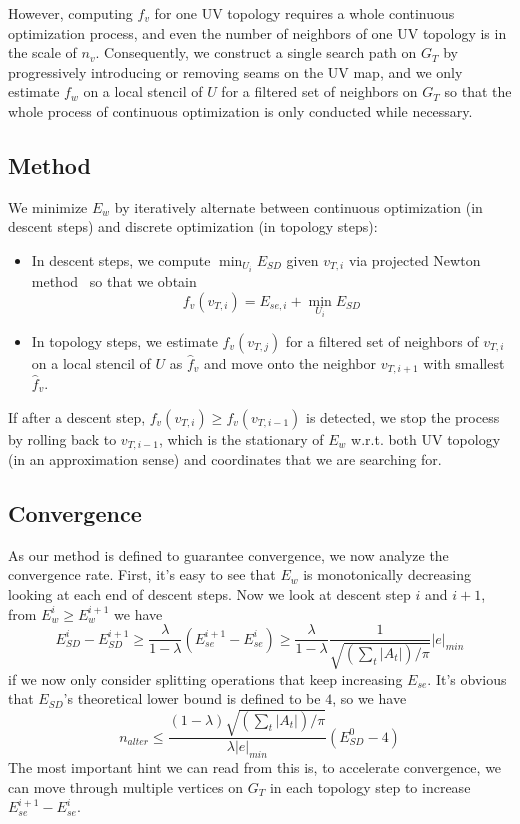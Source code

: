 However, computing $f_v$ for one UV topology requires a whole continuous optimization process, and even the number of neighbors of one UV topology is in the scale of $n_v$. Consequently, we construct a single search path on $G_T$ by progressively introducing or removing seams on the UV map, and we only estimate $f_w$ on a local stencil of $U$ for a filtered set of neighbors on $G_T$ so that the whole process of continuous optimization is only conducted while necessary.

\subsection{Method}

We minimize $E_w$ by iteratively alternate between continuous optimization (in descent steps) and discrete optimization (in topology steps):
\begin{itemize}
\item In descent steps, we compute $\min_{U_i} E_{SD}$ given $v_{T,i}$ via projected Newton method~\cite{Teran2005Robust} so that we obtain
\[ f_v(v_{T,i}) = E_{se,i} + \min_{U_i} E_{SD} \]
\item In topology steps, we estimate $f_v(v_{T,j})$ for a filtered set of neighbors of $v_{T,i}$ on a local stencil of $U$ as $\hat{f}_v$ and move onto the neighbor $v_{T,i+1}$ with smallest $\hat{f}_v$.
\end{itemize}
If after a descent step, $f_v(v_{T,i}) \geq f_v(v_{T,i-1})$ is detected, we stop the process by rolling back to $v_{T,i-1}$, which is the stationary of $E_w$ w.r.t. both UV topology (in an approximation sense) and coordinates that we are searching for.

\subsection{Convergence}

As our method is defined to guarantee convergence, we now analyze the convergence rate. First, it's easy to see that $E_w$ is monotonically decreasing looking at each end of descent steps. Now we look at descent step $i$ and $i+1$, from $E^i_w \geq E^{i+1}_w$ we have
\[ E^i_{SD} - E^{i+1}_{SD} \geq \frac{\lambda}{1-\lambda} (E^{i+1}_{se} - E^i_{se}) \geq \frac{\lambda}{1-\lambda} \frac{1}{\sqrt{(\sum_t |A_t|)/\pi}} |e|_{min} \]
if we now only consider splitting operations that keep increasing $E_{se}$. It's obvious that $E_{SD}$'s theoretical lower bound is defined to be $4$, so we have
\[ n_{alter} \leq \frac{(1-\lambda)\sqrt{(\sum_t |A_t|)/\pi}}{\lambda|e|_{min}} (E^0_{SD} - 4) \]
The most important hint we can read from this is, to accelerate convergence, we can move through multiple vertices on $G_T$ in each topology step to increase $E^{i+1}_{se} - E^i_{se}$. 





